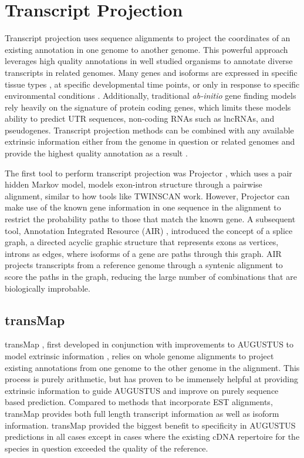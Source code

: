 \documentclass[fleqn,10pt]{wlscirep}
\begin{document}
\section*{Transcript Projection}

Transcript projection uses sequence alignments to project the coordinates of an existing annotation in one genome to another genome. This powerful approach leverages high quality annotations in well studied organisms to annotate diverse transcripts in related genomes. Many genes and isoforms are expressed in specific tissue types \cite{gtex2015genotype}, at specific developmental time points, or only in response to specific environmental conditions \cite{peng2011integrative}. Additionally, traditional \textit{ab-initio} gene finding models rely heavily on the signature of protein coding genes, which limits these models ability to predict UTR sequences, non-coding RNAs such as lncRNAs, and pseudogenes. Transcript projection methods can be combined with any available extrinsic information either from the genome in question or related genomes and provide the highest quality annotation as a result \cite{stanke2008using}.

The first tool to perform transcript projection was Projector \cite{meyer2004gene}, which uses a pair hidden Markov model, models exon-intron structure through a pairwise alignment, similar to how tools like TWINSCAN work. However, Projector can make use of the known gene information in one sequence in the alignment to restrict the probability paths to those that match the known gene. A subsequent tool, Annotation Integrated Resource (AIR) \cite{florea2005gene}, introduced the concept of a splice graph, a directed acyclic graphic structure that represents exons as vertices, introns as edges, where isoforms of a gene are paths through this graph. AIR projects transcripts from a reference genome through a syntenic alignment to score the paths in the graph, reducing the large number of combinations that are biologically improbable. 

\subsection*{transMap}
transMap \cite{stanke2008using}, first developed in conjunction with improvements to AUGUSTUS to model extrinsic information \cite{stanke2004augustus}, relies on whole genome alignments to project existing annotations from one genome to the other genome in the alignment. This process is purely arithmetic, but has proven to be immensely helpful at providing extrinsic information to guide AUGUSTUS and improve on purely sequence based prediction. Compared to methods that incorporate EST alignments, transMap provides both full length transcript information as well as isoform information. transMap provided the biggest benefit to specificity in AUGUSTUS predictions in all cases except in cases where the existing cDNA repertoire for the species in question exceeded the quality of the reference.
\end{document}
